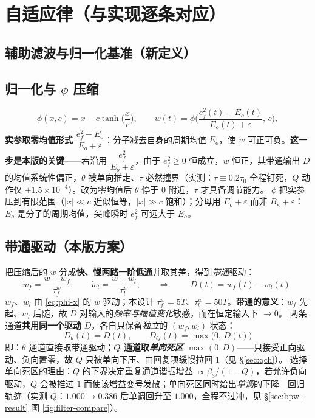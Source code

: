 \documentclass[11pt]{article}
\theoremstyle{remark}\newtheorem{remark}{注}
\newcommand{\ef}{e_f}
\begin{document}
\section{自适应律（与实现逐条对应）}\label{sec:law}
\subsection{辅助滤波与归一化基准（新定义）}\label{sec:aux}
\subsection{归一化与 $\phi$ 压缩}\label{sec:x}
\begin{equation}
  \phi(x,c)=x-c\tanh\!\Big(\frac{x}{c}\Big),\qquad
  w(t)=\phi\!\Big(\frac{\ef^{2}(t)-E_o(t)}{E_o(t)+\varepsilon},\,c\Big),
  \label{eq:phi-x}
\end{equation}
\textbf{实参取零均值形式} $\dfrac{\ef^{2}-E_o}{E_o+\varepsilon}$：分子减去自身的周期均值 $E_o$，使 $w$ 可正可负。\textbf{这一步是本版的关键}——若沿用 $\dfrac{\ef^{2}}{E_o+\varepsilon}$，由于 $\ef^{2}\ge0$ 恒成立，$w$ 恒正，其带通输出 $D$ 的均值系统性偏正，$\theta$ 被单向推走、$\tau$ 必然撞界（实测：$\tau\equiv0.2\tau_0$ 全程钉死，$Q$ 动作仅 $\pm1.5\times10^{-4}$）。改为零均值后 $\theta$ 停于 $0$ 附近，$\tau$ 才具备调节能力。
$\phi$ 把实参压到有限范围（$|x|\ll c$ 近似恒等，$|x|\gg c$ 饱和）；分母用 $E_o+\varepsilon$ 而非 $B_\kappa+\varepsilon$：$E_o$ 是分子的周期均值，尖峰瞬时 $\ef^{2}$ 可远大于 $E_o$。
\subsection{带通驱动（本版方案）}\label{sec:bpw}
把压缩后的 $w$ 分成\textbf{快、慢两路一阶低通}并取其差，得到\emph{带通}驱动：
\begin{equation}
  \dot w_f=\frac{w-w_f}{\tau_f^{w}},\qquad \dot w_l=\frac{w-w_l}{\tau_l^{w}},
  \qquad\Longrightarrow\qquad
  \boxed{\;D(t)=w_f(t)-w_l(t)\;}
  \label{eq:bpw}
\end{equation}
$w_f$、$w_l$ 由 \eqref{eq:phi-x} 的 $w$ 驱动；本设计 $\tau_f^{w}=5T$、$\tau_l^{w}=50T$。\textbf{带通的意义}：$w_f$ 先起、$w_l$ 后随，故 $D$ 对输入的\emph{频率与幅值变化}敏感，而在恒定输入下 $\to0$。
两条通道\textbf{共用同一个驱动} $D$，各自只保留\emph{独立}的 $(w_f,w_l)$ 状态：
\begin{equation}
  \boxed{\;D_\theta(t)=D(t),\qquad D_Q(t)=\max\bigl(0,\,D(t)\bigr)\;}
  \label{eq:shared-D}
\end{equation}
即：$\theta$ 通道直接取带通驱动；\textbf{$Q$ 通道取\emph{单向死区} $\max(0,D)$}——只接受正向驱动、负向置零，故 $Q$ 只被单向下压、由回复项缓慢拉回 $1$（见 \S\ref{sec:qch}）。
选择单向死区的理由：$Q$ 的下界决定重复通道谐振增益 $\propto\beta_3/(1-Q)$，若允许负向驱动，$Q$ 会被推过 $1$ 而使该增益变号发散；单向死区同时给出\emph{单调}的下降—回归轨迹（实测 $Q$：$1.000\to0.386$ 后单调回升至 $1.000$，全程不过冲，见 \S\ref{sec:bpw-result} 图 \ref{fig:filter-compare}）。
\end{document}
